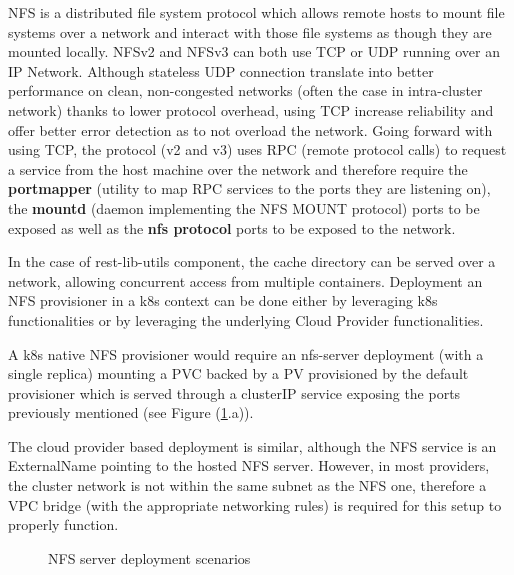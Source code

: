 \documentclass[11pt]{article}
\begin{document}

\vspace{-5mm}\hspace{5mm} NFS is a distributed file system protocol which allows remote hosts to mount file systems over a network and interact with those file systems as though they are mounted locally. NFSv2 and NFSv3 can both use TCP or UDP running over an IP Network. Although stateless UDP connection translate into better performance on clean, non-congested networks (often the case in intra-cluster network) thanks to lower protocol overhead, using TCP increase reliability and offer better error detection as to not overload the network. Going forward with using TCP, the protocol (v2 and v3) uses RPC (remote protocol calls) to request a service from the host machine over the network and therefore require the \textbf{portmapper} (utility to map RPC services to the ports they are listening on), the \textbf{mountd} (daemon implementing the NFS MOUNT protocol) ports to be exposed as well as the \textbf{nfs protocol} ports to be exposed to the network. 

In the case of rest-lib-utils component, the cache directory can be served over a network, allowing concurrent access from multiple containers. Deployment an NFS provisioner in a k8s context can be done either by leveraging k8s functionalities or by leveraging the underlying Cloud Provider functionalities.

A k8s native NFS provisioner would require an nfs-server deployment (with a single replica) mounting a PVC backed by a PV provisioned by the default provisioner which is served through a clusterIP service exposing the ports previously mentioned (see Figure (\ref{fig:vulas_nfs}.a)). 

The cloud provider based deployment is similar, although the NFS service is an ExternalName pointing to the hosted NFS server. However, in most providers, the cluster network is not within the same subnet as the NFS one, therefore a VPC bridge (with the appropriate networking rules) is required for this setup to properly function.

\vspace{2mm}
\begin{figure}[h]
    \centering
    \hspace{2mm}\vrule\hspace{2mm}
    \caption{NFS server deployment scenarios}
    \label{fig:vulas_nfs}
\end{figure}
\end{document}
